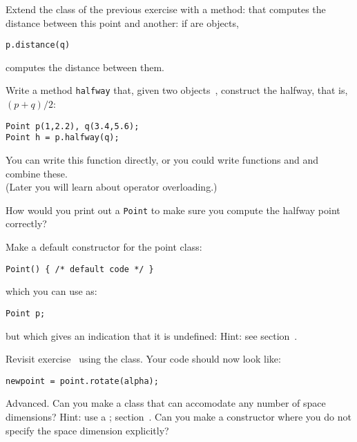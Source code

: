 \begin{exercise}
  \label{ex:geom:pointpoint}
  Extend the  class of the previous exercise with a method:
   that computes the distance between this point and
  another: if  are  objects,
\begin{lstlisting}
p.distance(q) 
\end{lstlisting}
computes the distance between them.
\end{exercise}


\begin{exercise}
  \label{ex:geom:pointhalfway}
  Write a method \lstinline{halfway} that, given two 
  objects~, construct the  halfway, that
  is,~$(p+q)/2$:
\begin{lstlisting}
Point p(1,2.2), q(3.4,5.6);
Point h = p.halfway(q);
\end{lstlisting}

  You can write this function directly, or you could write functions
   and  and combine these.\\
  (Later you will learn about operator overloading.)

  How would you print out a \lstinline{Point} to make sure
  you compute the halfway point correctly?
\end{exercise}

\begin{exercise}
  Make a default constructor for the point class:
\begin{lstlisting}
Point() { /* default code */ }
\end{lstlisting}
  which you can use as:
\begin{lstlisting}
Point p;
\end{lstlisting}
but which gives an indication that it is undefined:
%
%
Hint: see section~.
\end{exercise}

\begin{exercise}
  \label{ex:pointrotate-class}
  Revisit exercise~ using the 
  class. Your code should now look like:
\begin{lstlisting}
newpoint = point.rotate(alpha);
\end{lstlisting}
\end{exercise}

\begin{exercise}
  Advanced. Can you make a  class that can accomodate any
  number of space dimensions? Hint: use a ;
  section~. Can you make a constructor where you do
  not specify the space dimension explicitly?
\end{exercise}

